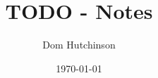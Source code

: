 \documentclass[11pt,a4paper]{article}
\begin{document}
\title{TODO - Notes}
\author{Dom Hutchinson}
\date{\today}
\maketitle

\tableofcontents\newpage
\end{document}
